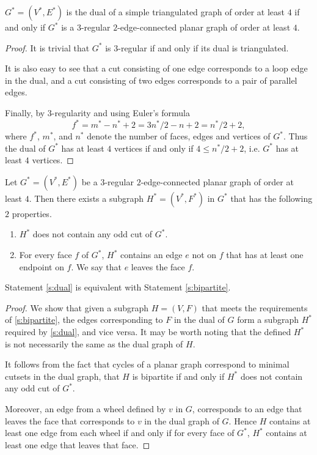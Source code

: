\begin{claim} \label{c:dual}
  $G^* = (V^*, E^*)$ is the dual of a simple triangulated graph of order at least $4$
  if and only if $G^*$ is a $3$-regular $2$-edge-connected planar graph of order at least $4$.
\end{claim}
\begin{proof}
  It is trivial that $G^*$ is $3$-regular if and only if its dual is triangulated.

  It is also easy to see that a cut consisting of one edge corresponds to a loop
  edge in the dual, and a cut consisting of two edges corresponds to a pair of parallel edges.

  Finally, by $3$-regularity and using Euler's formula $$f^* = m^* - n^* + 2 =
  3n^*/2 - n + 2 = n^*/2 + 2,$$ where $f^*$, $m^*$, and $n^*$ denote the number of faces, edges
  and vertices of $G^*$. Thus the dual of $G^*$ has at least $4$ vertices if
  and only if $4 \le n^*/2 + 2$, i.e. $G^*$ has at least $4$ vertices.
\end{proof}

\begin{guess} \label{s:dual}
  Let $G^* = (V^*, E^*)$ be a $3$-regular $2$-edge-connected planar graph of order at least $4$.
  Then there exists a subgraph $H^* = (V^*, F^*)$ in $G^*$ that has the following $2$ properties.
  \begin{enumerate}
    \item $H^*$ does not contain any odd cut of $G^*$.
    \item For every face $f$ of $G^*$, $H^*$ contains an edge $e$ not on $f$ that has at least one
    endpoint on $f$. We say that $e$ leaves the face $f$.
  \end{enumerate}
\end{guess}

\begin{claim}
  Statement \ref{s:dual} is equivalent with Statement \ref{s:bipartite}.
\end{claim}
\begin{proof}
  We show that given a subgraph $H = (V, F)$ that meets the requirements of \ref{s:bipartite},
  the edges corresponding to $F$ in the dual of $G$ form a subgraph $H^*$ required by
  \ref{s:dual}, and vice versa. It may be worth noting that the defined $H^*$ is
  not necessarily the same as the dual graph of $H$.

  It follows from the fact that cycles of a planar graph correspond to minimal cutsets in the
  dual graph, that $H$ is bipartite if and only if $H^*$ does not contain any odd cut of $G^*$.

  Moreover, an edge from a wheel defined by $v$ in $G$, corresponds to an edge
  that leaves the face that corresponds to $v$ in the dual graph of $G$.
  Hence $H$ contains at least one edge from each wheel if and only if for every face
  of $G^*$, $H^*$ contains at least one edge that leaves that face.
\end{proof}


